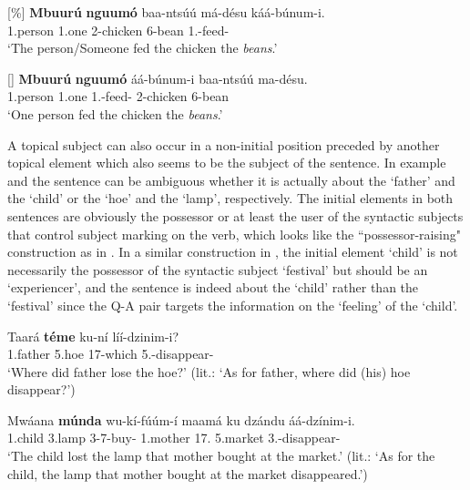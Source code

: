 \documentclass[output=paper,colorlinks,citecolor=brown,
]{langscibook}
\begin{document}
\begin{exe}
    \ex \label{96}
    \begin{xlist}
    \judgewidth{\%}
\ex
[\%]{
\label{96a}
\gll
\textbf{Mbuurú} \textbf{nguumó} baa-ntsúú má-désu káá-búnum-i.\\
1.person 1.one 2-chicken 6-bean 1\Sm{}.\Pst{}-feed-\Pst{}\\
\trans ‘The person/Someone fed the chicken the \textit{beans}.’
}

\ex
[]{
\label{96b}
\gll
\textbf{Mbuurú} \textbf{nguumó} áá-búnum-i baa-ntsúú ma-désu.\\
1.person 1.one 1\Sm{}.\Pst{}-feed-\Pst{} 2-chicken 6-bean\\
\trans ‘One person fed the chicken the \textit{beans}.’
}

    \end{xlist}
\end{exe}
A topical subject can also occur in a non-initial position preceded by another topical element which also seems to be the subject of the sentence. In example  and  the sentence can be ambiguous whether it is actually about the `father' and the `child' or the `hoe' and the `lamp', respectively. The initial elements in both sentences are obviously the possessor or at least the user of the syntactic subjects that control subject marking on the verb, which looks like the ``possessor-raising" construction as in . In a similar construction in , the initial element `child' is not necessarily the possessor of the syntactic subject `festival' but should be an `experiencer', and the sentence is indeed about the `child' rather than the `festival' since the Q-A pair targets the information on the `feeling' of the `child'.
\begin{exe}
\ex
\label{97}
\gll
Taará \textbf{téme} ku-ní líí-dzinim-i?\\
1.father 5.hoe 17-which 5\Sm{}.\Pst{}-disappear-\Pst{}\\
\trans ‘Where did father lose the hoe?' (lit.: `As for father, where did (his) hoe disappear?')

\end{exe}
\begin{exe} 
\ex
\label{98}
\gll
Mwáana \textbf{múnda} wu-kí-fúúm-í maamá ku dzándu áá-dzínim-i.\\
1.child 3.lamp 3\Rel{}-7\Sm{}-buy-\Pst{} 1.mother 17.\Loc{} 5.market 3\Sm{}.\Pst{}-disappear-\Pst{}\\
\trans ‘The child lost the lamp that mother bought at the market.’ (lit.: `As for the child, the lamp that mother bought at the market disappeared.')

\end{exe}
\end{document}
